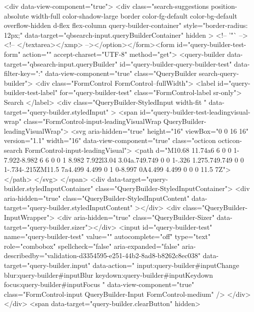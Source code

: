 {{          <div data-view-component="true">        <div class="search-suggestions position-absolute width-full color-shadow-large border color-fg-default color-bg-default overflow-hidden d-flex flex-column query-builder-container"
          style="border-radius: 12px;"
          data-target="qbsearch-input.queryBuilderContainer"
          hidden
        >
          <!-- '"` --><!-- </textarea></xmp> --></option></form><form id="query-builder-test-form" action="" accept-charset="UTF-8" method="get">
  <query-builder data-target="qbsearch-input.queryBuilder" id="query-builder-query-builder-test" data-filter-key=":" data-view-component="true" class="QueryBuilder search-query-builder">
    <div class="FormControl FormControl--fullWidth">
      <label id="query-builder-test-label" for="query-builder-test" class="FormControl-label sr-only">
        Search
      </label>
      <div
        class="QueryBuilder-StyledInput width-fit "
        data-target="query-builder.styledInput"
      >
          <span id="query-builder-test-leadingvisual-wrap" class="FormControl-input-leadingVisualWrap QueryBuilder-leadingVisualWrap">
            <svg aria-hidden="true" height="16" viewBox="0 0 16 16" version="1.1" width="16" data-view-component="true" class="octicon octicon-search FormControl-input-leadingVisual">
    <path d="M10.68 11.74a6 6 0 0 1-7.922-8.982 6 6 0 0 1 8.982 7.922l3.04 3.04a.749.749 0 0 1-.326 1.275.749.749 0 0 1-.734-.215ZM11.5 7a4.499 4.499 0 1 0-8.997 0A4.499 4.499 0 0 0 11.5 7Z"></path>
</svg>
          </span>
        <div data-target="query-builder.styledInputContainer" class="QueryBuilder-StyledInputContainer">
          <div
            aria-hidden="true"
            class="QueryBuilder-StyledInputContent"
            data-target="query-builder.styledInputContent"
          ></div>
          <div class="QueryBuilder-InputWrapper">
            <div aria-hidden="true" class="QueryBuilder-Sizer" data-target="query-builder.sizer"></div>
            <input id="query-builder-test" name="query-builder-test" value="" autocomplete="off" type="text" role="combobox" spellcheck="false" aria-expanded="false" aria-describedby="validation-d3354595-e251-44b2-8ad8-b8262c8ec038" data-target="query-builder.input" data-action="
          input:query-builder#inputChange
          blur:query-builder#inputBlur
          keydown:query-builder#inputKeydown
          focus:query-builder#inputFocus
        " data-view-component="true" class="FormControl-input QueryBuilder-Input FormControl-medium" />
          </div>
        </div>
          <span data-target="query-builder.clearButton" hidden>
}}
